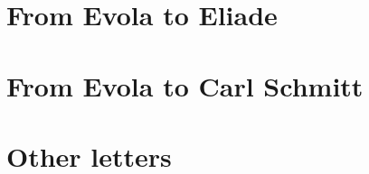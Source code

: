 \documentclass[a4paper,12pt,twoside]{book}
\begin{document}
\section{From Evola to Eliade}




\section{From Evola to Carl Schmitt}


\section{Other letters}



\end{document}
